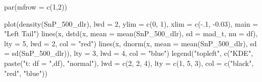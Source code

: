 \documentclass[
  letterpaper,
  DIV=11,
  numbers=noendperiod]{scrartcl}
\newenvironment{Shaded}{\begin{snugshade}}{\end{snugshade}}
\newcommand{\AttributeTok}[1]{\textcolor[rgb]{0.40,0.45,0.13}{#1}}
\newcommand{\DecValTok}[1]{\textcolor[rgb]{0.68,0.00,0.00}{#1}}
\newcommand{\FloatTok}[1]{\textcolor[rgb]{0.68,0.00,0.00}{#1}}
\newcommand{\FunctionTok}[1]{\textcolor[rgb]{0.28,0.35,0.67}{#1}}
\newcommand{\NormalTok}[1]{\textcolor[rgb]{0.00,0.23,0.31}{#1}}
\newcommand{\SpecialCharTok}[1]{\textcolor[rgb]{0.37,0.37,0.37}{#1}}
\newcommand{\StringTok}[1]{\textcolor[rgb]{0.13,0.47,0.30}{#1}}
\begin{document}
\begin{Shaded}
\begin{Highlighting}[]
\FunctionTok{par}\NormalTok{(}\AttributeTok{mfrow =} \FunctionTok{c}\NormalTok{(}\DecValTok{1}\NormalTok{,}\DecValTok{2}\NormalTok{))}

\FunctionTok{plot}\NormalTok{(}\FunctionTok{density}\NormalTok{(SnP\_500\_dlr), }\AttributeTok{lwd =} \DecValTok{2}\NormalTok{, }\AttributeTok{ylim =} \FunctionTok{c}\NormalTok{(}\DecValTok{0}\NormalTok{, }\DecValTok{1}\NormalTok{), }\AttributeTok{xlim =} \FunctionTok{c}\NormalTok{(}\SpecialCharTok{{-}}\NormalTok{.}\DecValTok{1}\NormalTok{, }\SpecialCharTok{{-}}\FloatTok{0.03}\NormalTok{),}
     \AttributeTok{main =} \StringTok{"Left Tail"}\NormalTok{)}
\FunctionTok{lines}\NormalTok{(x, }\FunctionTok{dstd}\NormalTok{(x, }\AttributeTok{mean =} \FunctionTok{mean}\NormalTok{(SnP\_500\_dlr), }\AttributeTok{sd =}\NormalTok{ mad\_t, }\AttributeTok{nu =}\NormalTok{ df),}
 \AttributeTok{lty =} \DecValTok{5}\NormalTok{, }\AttributeTok{lwd =} \DecValTok{2}\NormalTok{, }\AttributeTok{col =} \StringTok{"red"}\NormalTok{)}
\FunctionTok{lines}\NormalTok{(x, }\FunctionTok{dnorm}\NormalTok{(x, }\AttributeTok{mean =} \FunctionTok{mean}\NormalTok{(SnP\_500\_dlr), }\AttributeTok{sd =} \FunctionTok{sd}\NormalTok{(SnP\_500\_dlr)),}
 \AttributeTok{lty =} \DecValTok{3}\NormalTok{, }\AttributeTok{lwd =} \DecValTok{4}\NormalTok{, }\AttributeTok{col =} \StringTok{"blue"}\NormalTok{)}
\FunctionTok{legend}\NormalTok{(}\StringTok{"topleft"}\NormalTok{, }\FunctionTok{c}\NormalTok{(}\StringTok{"KDE"}\NormalTok{, }\FunctionTok{paste}\NormalTok{(}\StringTok{"t: df = "}\NormalTok{,df), }\StringTok{"normal"}\NormalTok{),}
 \AttributeTok{lwd =} \FunctionTok{c}\NormalTok{(}\DecValTok{2}\NormalTok{, }\DecValTok{2}\NormalTok{, }\DecValTok{4}\NormalTok{), }\AttributeTok{lty =} \FunctionTok{c}\NormalTok{(}\DecValTok{1}\NormalTok{, }\DecValTok{5}\NormalTok{, }\DecValTok{3}\NormalTok{),}
 \AttributeTok{col =} \FunctionTok{c}\NormalTok{(}\StringTok{"black"}\NormalTok{, }\StringTok{"red"}\NormalTok{, }\StringTok{"blue"}\NormalTok{))}


\end{Highlighting}
\end{Shaded}
\end{document}
